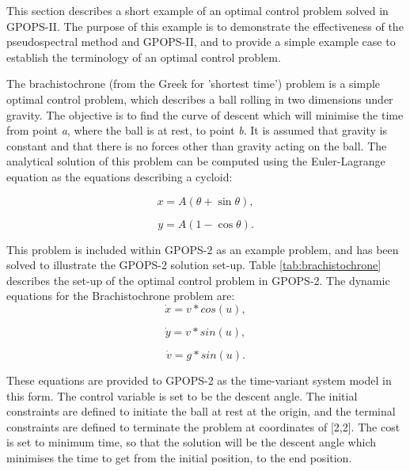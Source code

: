 This section describes a short example of an optimal control problem solved in GPOPS-II. The purpose of this example is to demonstrate the effectiveness of the pseudospectral method and GPOPS-II, and to provide a simple example case to establish the terminology of an optimal control problem.  


The brachistochrone (from the Greek for 'shortest time') problem is a simple optimal control problem, which describes a ball rolling in two dimensions under gravity. The objective is to find the curve of descent which will minimise the time from point \textit{a}, where the ball is at rest, to point \textit{b}. It is assumed that gravity is constant and that there is no forces other than gravity acting on the ball. 
The analytical solution of this problem can be computed using the Euler-Lagrange equation as the equations describing a cycloid:

\begin{equation}
x = A(\theta + \sin\theta) ,
\end{equation}

\begin{equation}
y=A(1 - \cos\theta).
\end{equation}

This problem is included within GPOPS-2 as an example problem, and has been solved to illustrate the GPOPS-2 solution set-up\cite{Rao2010}. Table \ref{tab:brachistochrone} describes the set-up of the optimal control problem in GPOPS-2. The dynamic equations for the Brachistochrone problem are:
\begin{equation}
\dot{x} = v*cos(u),
\end{equation}

\begin{equation}
\dot{y} = v*sin(u),
\end{equation}

\begin{equation}
\dot{v} = g*sin(u).
\end{equation}

\noindent These equations are provided to GPOPS-2 as the time-variant system model in this form. The control variable is set to be the descent angle. The initial constraints are defined to initiate the ball at rest at the origin, and the terminal constraints are defined to terminate the problem at coordinates of [2,2]. The cost is set to minimum time, so that the solution will be the descent angle which minimises the time to get from the initial position, to the end position. 

